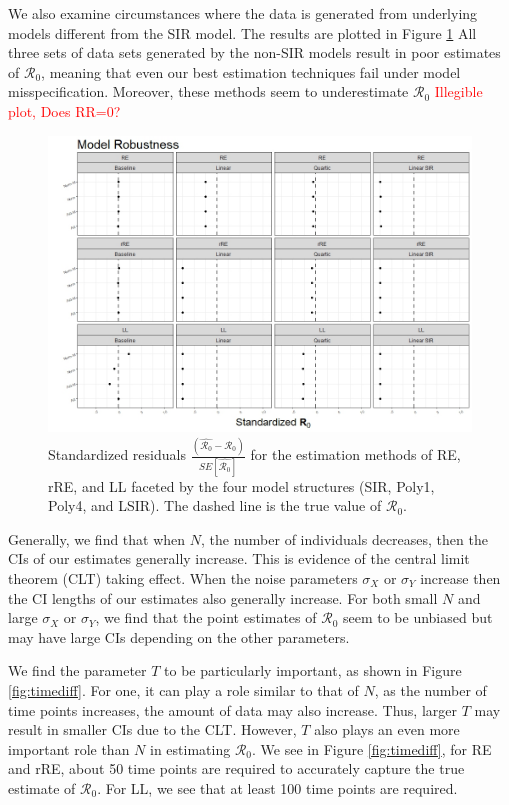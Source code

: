 \documentclass[12pt]{article}
\newcommand{\com}[1]{\textcolor{red}{ #1}}
\newcommand{\rr}{\ensuremath{\mathcal{R}_0}}
\begin{document}
We also examine circumstances where the data is generated from underlying models different from the SIR model.  The results are plotted in Figure \ref{fig:mod-rob}  All three sets of data sets generated by the non-SIR models result in poor estimates of $\rr$, meaning that even our best estimation techniques fail under model misspecification.  Moreover, these methods seem to underestimate $\rr$ \com{Illegible plot, Does RR=0?}

\begin{figure}[H]
	\centering
	\includegraphics[scale=0.5]{images/model_robust.jpeg}
	\caption{Standardized residuals $\frac{\left ( \hat{\rr} - \rr\right ) }{SE \left [\hat{\rr}\right ]}$ for the estimation methods of RE, rRE, and LL faceted by the four model structures (SIR, Poly1, Poly4, and LSIR).  The dashed line is the true value of $\rr$.}\label{fig:mod-rob}
\end{figure}


Generally, we find that when $N$, the number of individuals decreases, then the CIs of our estimates generally increase.  This is evidence of the  central limit theorem (CLT) taking effect.   When the noise parameters $\sigma_X$ or $\sigma_Y$ increase then the CI lengths of our estimates also generally increase.  For both small $N$ and large $\sigma_X$ or $\sigma_Y$, we find that the point estimates of $\rr$ seem to be unbiased but may have large CIs depending on the other parameters.

We find the parameter $T$ to be particularly important, as shown in Figure \ref{fig:timediff}.  For one, it can play a role similar to that of $N$, as the number of time points increases, the amount of data may also increase.  Thus, larger $T$ may result in smaller CIs due to the CLT.  However, $T$ also plays an even more important role than $N$ in estimating $\rr$.  We see in Figure \ref{fig:timediff}, for RE and rRE, about 50 time points are required to accurately capture the true estimate of $\rr$.  For LL, we see that at least 100 time points are required.
\end{document}
